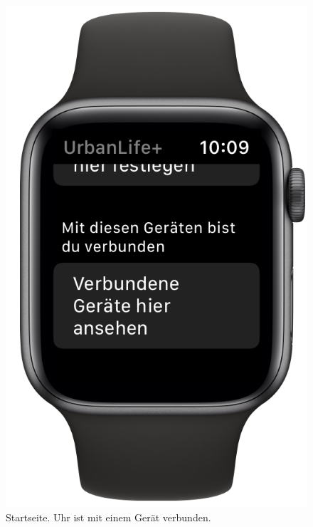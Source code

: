 \begin{minipage}{.45\textwidth}
	\begin{figure}[H]
		\centering
		\includegraphics[width=.68\textwidth]{./images/prototype/watchos/homeIsConnected.png}
		\caption{\label{fig:app:watchos:homeIsConnected}Startseite. Uhr ist mit einem Gerät verbunden.}
	\end{figure}
\end{minipage}


